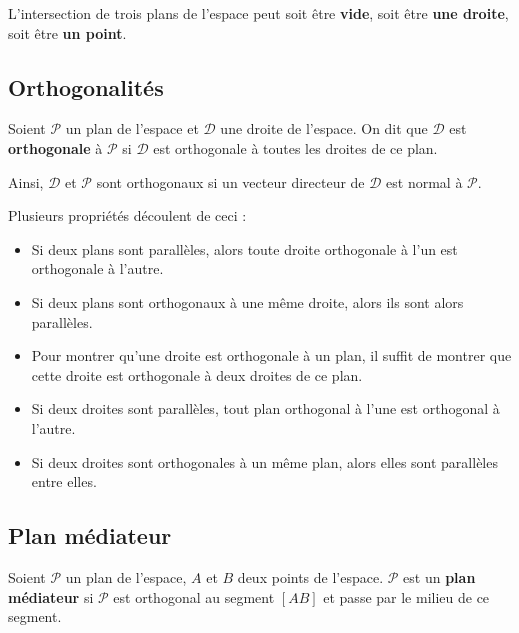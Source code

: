 	\begin{tip}
		L'intersection de trois plans de l'espace peut soit être \textbf{vide}, soit être \textbf{une droite}, soit être \textbf{un point}.
	\end{tip}
	
	\subsection{Orthogonalités}
	
	\begin{formula}[Définition]
		Soient $\mathcal{P}$ un plan de l'espace et $\mathcal{D}$ une droite de l'espace. On dit que $\mathcal{D}$ est \textbf{orthogonale} à $\mathcal{P}$ si $\mathcal{D}$ est orthogonale à toutes les droites de ce plan.
	\end{formula}
	
	\begin{tip}
		Ainsi, $\mathcal{D}$ et $\mathcal{P}$ sont orthogonaux si un vecteur directeur de $\mathcal{D}$ est normal à $\mathcal{P}$.
	\end{tip}
	
	\begin{tip}[Propriétés]
		Plusieurs propriétés découlent de ceci :
		\begin{itemize}
			\item Si deux plans sont parallèles, alors toute droite orthogonale à l'un est orthogonale à l'autre.
			\item Si deux plans sont orthogonaux à une même droite, alors ils sont alors parallèles.
			\item Pour montrer qu'une droite est orthogonale à un plan, il suffit de montrer que cette droite est orthogonale à deux droites de ce plan.
			\item Si deux droites sont parallèles, tout plan orthogonal à l'une est orthogonal à l'autre.
			\item Si deux droites sont orthogonales à un même plan, alors elles sont parallèles entre elles.
		\end{itemize}
	\end{tip}
	
	\subsection{Plan médiateur}
	
	\begin{formula}[Définition]
		Soient $\mathcal{P}$ un plan de l'espace, $A$ et $B$ deux points de l'espace.
		\newpar
		$\mathcal{P}$ est un \textbf{plan médiateur} si $\mathcal{P}$ est orthogonal au segment $[AB]$ et passe par le milieu de ce segment.
	\end{formula}

